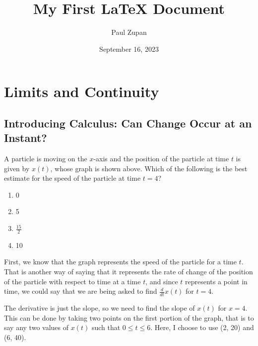 \documentclass{article}
\title{My First LaTeX Document}
\author{Paul Zupan}
\date{September 16, 2023}
\begin{document}
\maketitle

\section{Limits and Continuity}

\subsection{Introducing Calculus: Can Change Occur at an Instant?}


A particle is moving on the $x$-axis and the position of the particle at time
$t$ is given by $x(t)$, whose graph is shown above. Which of the following is
the best estimate for the speed of the particle at time $t = 4$?

\begin{enumerate}[label=\Alph*]
    \item 0
    \item 5
    \item $\frac{15}{2}$
    \item 10
\end{enumerate}

First, we know that the graph represents the speed of the particle for a time
$t$. That is another way of saying that it represents the rate of change of the
position of the particle with respect to time at a time $t$, and since $t$
represents a point in time, we could say that we are being asked to find
$\frac{d}{dt} x(t)$ for $t = 4$.

The derivative is just the slope, so we need to find the slope of $x(t)$ for $x
= 4$. This can be done by taking two points on the first portion of the graph,
that is to say any two values of $x(t)$ such that $0 \leq t \leq 6$. Here, I
choose to use (2, 20) and (6, 40).
\end{document}
